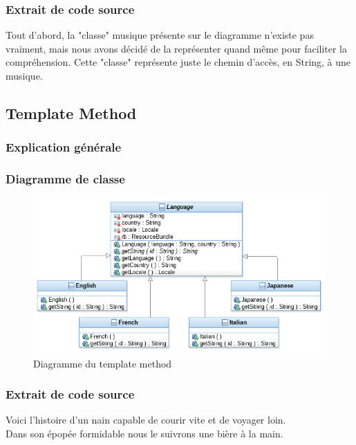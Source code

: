 \subsubsection{Extrait de code source}
Tout d'abord, la "classe" musique présente sur le diagramme n'existe pas vraiment, mais nous avons décidé de la représenter quand même pour faciliter la compréhension. Cette "classe" représente juste le chemin d'accès, en String, à une musique.


\newpage
\subsection{Template Method}

\subsubsection{Explication générale}

\subsubsection{Diagramme de classe}

\begin{figure}[h]
	\centering
	\includegraphics[width=\textwidth]{ttmc_template_method.png}
	\caption{Diagramme du template method}
	\label{fig:diag_template_method}
\end{figure}

\subsubsection{Extrait de code source}
Voici l'histoire d'un nain capable de courir vite et de voyager loin.\\
Dans son épopée formidable nous le suivrons une bière à la main.\\


